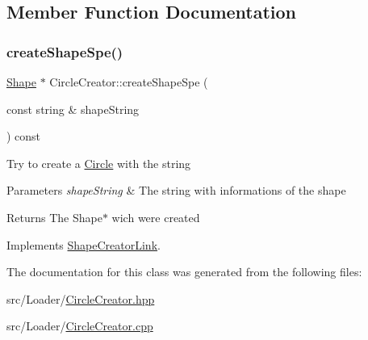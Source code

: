 \subsection{Member Function Documentation}
\hypertarget{class_circle_creator_ae77dd120e2521fdfb2e002228a1f0c25}{}\label{class_circle_creator_ae77dd120e2521fdfb2e002228a1f0c25} 
\subsubsection{\texorpdfstring{create\+Shape\+Spe()}{createShapeSpe()}}
{\footnotesize\ttfamily \hyperlink{class_shape}{Shape} $\ast$ Circle\+Creator\+::create\+Shape\+Spe (\begin{DoxyParamCaption}\item[{const string \&}]{shape\+String }\end{DoxyParamCaption}) const\hspace{0.3cm}{\ttfamily [virtual]}}

Try to create a \hyperlink{class_circle}{Circle} with the string 
\begin{DoxyParams}{Parameters}
{\em shape\+String} & The string with informations of the shape \\
\hline
\end{DoxyParams}
\begin{DoxyReturn}{Returns}
The Shape$\ast$ wich were created 
\end{DoxyReturn}


Implements \hyperlink{class_shape_creator_link_a036ecc845946d23b36335e9077308bcf}{Shape\+Creator\+Link}.



The documentation for this class was generated from the following files\+:\begin{DoxyCompactItemize}
\item 
src/\+Loader/\hyperlink{_circle_creator_8hpp}{Circle\+Creator.\+hpp}\item 
src/\+Loader/\hyperlink{_circle_creator_8cpp}{Circle\+Creator.\+cpp}\end{DoxyCompactItemize}
